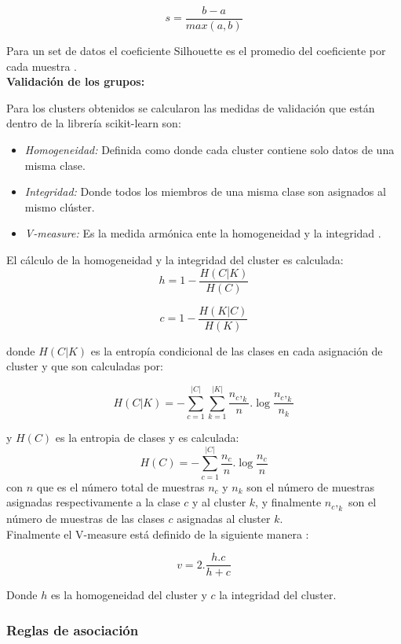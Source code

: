 {$$s = \frac{b-a}{max(a,b)}$$

Para un set de datos el coeficiente Silhouette es el promedio del coeficiente por cada muestra \cite{scikit-learn,Rousseeuw1987}. \\

\textbf{Validación de los grupos:}

Para los clusters obtenidos se calcularon las medidas de validación que están dentro de la librería scikit-learn \cite{scikit-learn} son:

\begin{itemize}
	\item  \textit{Homogeneidad:} Definida como donde cada cluster contiene solo datos de una misma clase.
	\item \textit{Integridad:} Donde todos los miembros de una misma clase son asignados al mismo clúster.	
	\item \textit{V-measure:} Es la medida armónica ente la homogeneidad y la integridad \cite{Rosenberg2007}. 		
\end{itemize}

El cálculo de la homogeneidad y la integridad del cluster es calculada:
$$h=1- \frac{H(C|K)}{H(C)} $$

$$c=1- \frac{H(K|C)}{H(K)}$$

donde $H(C|K)$ es la entropía condicional de las clases en cada asignación de cluster y que son calculadas por:

$$H(C|K)= - \sum_{c=1}^{|C|} \sum_{k=1}^{|K|} \frac{n_c,_k}{n} . \log \frac{n_c,_k}{n_k}$$ 

y $H(C)$ es la entropia de clases y es calculada:
$$H(C)=  - \sum_{c=1}^{|C|} \frac{n_c}{n} . \log \frac{n_c}{n}$$ 
con $n$ que es el número total de muestras $n_c$ y $n_k$ son el número de muestras asignadas respectivamente a la clase $c$ y al cluster $k$, y finalmente $n_c,_k$ son el número de muestras de las clases $c$ asignadas al cluster $k$.\\

Finalmente el V-measure está definido de la siguiente manera \cite{Rosenberg2007}:

$$v= 2.\frac{h.c}{h+c}$$

Donde $h$ es la homogeneidad del cluster  y $c$ la integridad del cluster. 

\subsubsection{Reglas de asociación}

}
